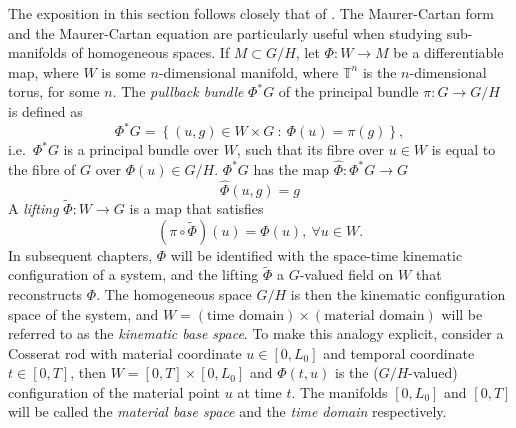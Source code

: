 The exposition in this section follows closely that of \citep{clellandFrenetCartanMethod2017}. The Maurer-Cartan form and the Maurer-Cartan equation are particularly useful when studying sub-manifolds of homogeneous spaces. If $M \subset G/H$, let $\Phi : W \to M$ be a differentiable map, where $W$ is some $n$-dimensional manifold, where $\mathbb{T}^n$ is the $n$-dimensional torus, for some $n$. The \textit{pullback bundle} $\Phi^*G$ of the principal bundle $\pi : G \to G/H$ is defined as
\begin{equation} \label{eq:pullback bundle}
\Phi^*G = \left\{ (u,g) \in W \times G\ :\ \Phi(u) = \pi(g) \right\},
\end{equation}
i.e.~$\Phi^* G$ is a principal bundle over $W$, such that its fibre over $u \in W$ is equal to the fibre of $G$ over $\Phi(u) \in G/H$. $\Phi^* G$ has the map $\hat{\Phi} : \Phi^*G \to G$
\begin{equation}
\hat{\Phi}(u, g) = g
\end{equation}
A \textit{lifting} $\tilde{\Phi} : W \to G$ is a map that satisfies
\begin{equation}
(\pi \circ \tilde{\Phi})(u) = \Phi(u),\ \forall u \in W.
\end{equation}
In subsequent chapters, $\Phi$ will be identified with the space-time kinematic configuration of a system, and the lifting $\tilde{\Phi}$ a $G$-valued field on $W$ that reconstructs $\Phi$. The homogeneous space $G/H$ is then the kinematic configuration space of the system, and $W = (\text{time domain}) \times (\text{material domain})$ will be referred to as the \textit{kinematic base space}. To make this analogy explicit, consider a Cosserat rod with material coordinate $u \in [0, L_0]$ and temporal coordinate $t \in [0, T]$, then $W = [0, T] \times [0, L_0]$ and $\Phi(t,u)$ is the ($G/H$-valued) configuration of the material point $u$ at time $t$. The manifolds $[0, L_0]$ and $[0, T]$ will be called the \textit{material base space} and the \textit{time domain} respectively.

